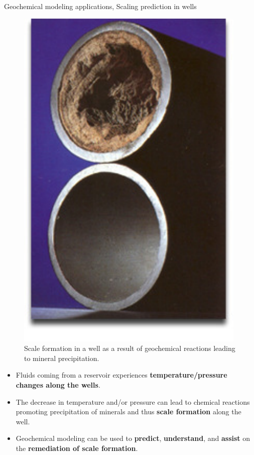 %
\begin{frame}{Geochemical modeling applications, Scaling prediction in wells}
%
\lcol
%
\vskip 20pt
\begin{figure}
\centering
\includegraphics[height=0.6\textheight]{figures/applications/scaling-calcium-strontium-barium}
\caption*{Scale formation in a well as a result of geochemical reactions leading
to mineral precipitation.}
\end{figure}
%
\rcol
\vskip -20pt
\begin{itemize}[<+->]
\item Fluids coming from a reservoir experiences \textbf{temperature\slash pressure
changes along the wells}.
\item The decrease in temperature and/or pressure can lead to chemical reactions 
promoting precipitation of minerals and thus \textbf{scale formation} along the well.
\item Geochemical modeling can be used to \textbf{predict}, \textbf{understand},
and \textbf{assist }on the \textbf{\alert{\textbf{remediation of scale formation}}}.
\end{itemize}
\ecol
%
\end{frame}

